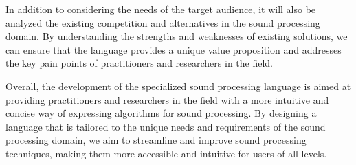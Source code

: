 In addition to considering the needs of the target audience, it will also be analyzed the existing competition and alternatives in the sound processing domain. By understanding the strengths and weaknesses of existing solutions, we can ensure that the language provides a unique value proposition and addresses the key pain points of practitioners and researchers in the field.

Overall, the development of the specialized sound processing language is aimed at providing practitioners and researchers in the field with a more intuitive and concise way of expressing algorithms for sound processing. By designing a language that is tailored to the unique needs and requirements of the sound processing domain, we aim to streamline and improve sound processing techniques, making them more accessible and intuitive for users of all levels.
